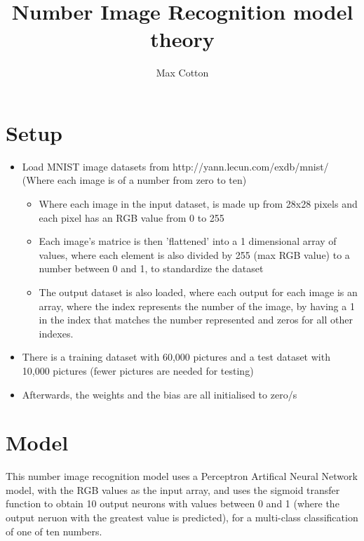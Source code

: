 \documentclass[10pt,a4paper]{article}
\title{Number Image Recognition model theory}
\author{Max Cotton}
\date{}
\begin{document}
\maketitle

\section{Setup}

\begin{itemize}
    \item Load MNIST image datasets from http://yann.lecun.com/exdb/mnist/ (Where each image is of a number from zero to ten)
    \begin{itemize}
        \item Where each image in the input dataset, is made up from 28x28 pixels and each pixel has an RGB value from 0 to 255
        \item Each image's matrice is then 'flattened' into a 1 dimensional array of values, where each element is also divided by 255 (max RGB value) to a number between 0 and 1, to standardize the dataset
        \item The output dataset is also loaded, where each output for each image is an array, where the index represents the number of the image, by having a 1 in the index that matches the number represented and zeros for all other indexes.
    \end{itemize}
    \item There is a training dataset with 60,000 pictures and a test dataset with 10,000 pictures (fewer pictures are needed for testing)
    \item Afterwards, the weights and the bias are all initialised to zero/s
\end{itemize}

\section{Model}
This number image recognition model uses a Perceptron Artifical Neural Network model, with the RGB values as the input array, and uses the sigmoid transfer function to obtain 10 output neurons with values between 0 and 1 (where the output neruon with the greatest value is predicted), for a multi-class classification of one of ten numbers.
\end{document}
